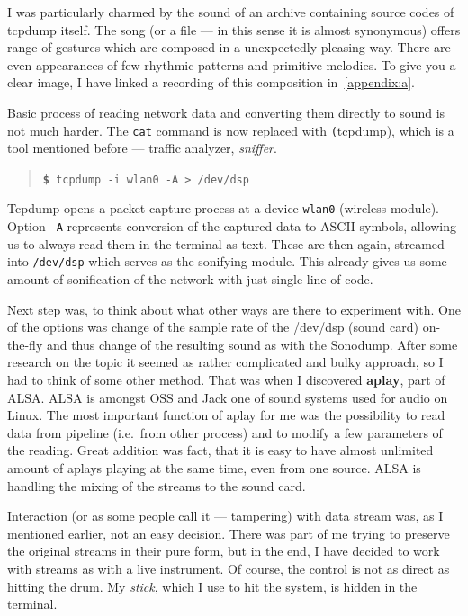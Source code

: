 \documentclass[12pt,a4paper,oneside]{report}
\begin{document}
I was particularly charmed by the sound of an archive containing source codes of tcpdump itself. The song (or a file --- in this sense it is almost synonymous) offers range of gestures which are composed in a unexpectedly pleasing way. There are even appearances of few rhythmic patterns and primitive melodies. To give you a clear image, I have linked a recording of this composition in~\autoref{appendix:a}.

Basic process of reading network data and converting them directly to sound is not much harder. The \texttt{cat} command is now replaced with \texttt(tcpdump), which is a tool mentioned before --- traffic analyzer, \emph{sniffer}.
\begin{quotation}
	\texttt{\textbf{\$} tcpdump -i wlan0 -A > /dev/dsp} 
\end{quotation}

Tcpdump opens a packet capture process at a device \texttt{wlan0} (wireless module). Option \texttt{-A} represents conversion of the captured data to ASCII symbols, allowing us to always read them in the terminal as text. These are then again, streamed into \texttt{/dev/dsp} which serves as the sonifying module. This already gives us some amount of sonification of the network with just single line of code. 

Next step was, to think about what other ways are there to experiment with. One of the options was change of the sample rate of the /dev/dsp (sound card) on-the-fly and thus change of the resulting sound as with the Sonodump. After some research on the topic it seemed as rather complicated and bulky approach, so I had to think of some other method. That was when I discovered \textbf{aplay}, part of ALSA. ALSA is amongst OSS and Jack one of sound systems used for audio on Linux. The most important function of aplay for me was the possibility to read data from pipeline (i.e.\ from other process) and to modify a few parameters of the reading. Great addition was fact, that it is easy to have almost unlimited amount of aplays playing at the same time, even from one source. ALSA is handling the mixing of the streams to the sound card.

Interaction (or as some people call it --- tampering) with data stream was, as I mentioned earlier, not an easy decision. There was part of me trying to preserve the original streams in their pure form, but in the end, I have decided to work with streams as with a live instrument. Of course, the control is not as direct as hitting the drum. My \emph{stick}, which I use to hit the system, is hidden in the terminal. 
\end{document}
